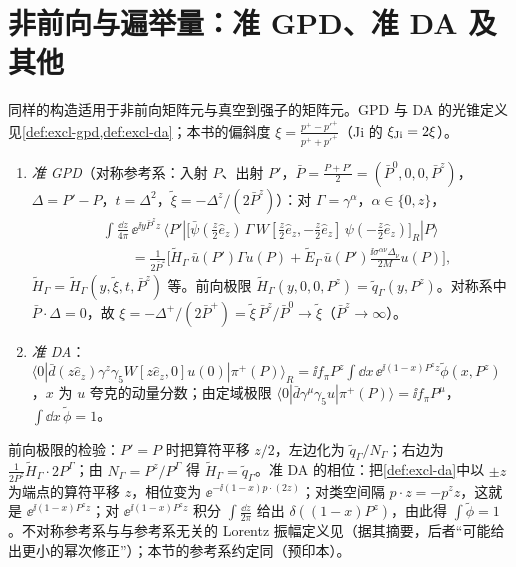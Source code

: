 \section{非前向与遍举量：准 GPD、准 DA 及其他}\label{sec:lamet-offforward}

同样的构造适用于非前向矩阵元与真空到强子的矩阵元。GPD 与 DA 的光锥定义见\cref{def:excl-gpd,def:excl-da}；本书的偏斜度 $\xi=\frac{p^+-p'^+}{p^++p'^+}$（Ji 的 $\xi_{\rm Ji}=2\xi$）。

\begin{definition}[准 GPD 与准 DA]\label{def:lamet-quasi-gpd}
\begin{enumerate}[label=(\roman*),leftmargin=2em,itemsep=1pt,topsep=2pt]
\item \emph{准 GPD}（对称参考系：入射 $P$、出射 $P'$，$\bar P=\frac{P+P'}2=(\bar P^0,0,0,\bar P^z)$，$\Delta=P'-P$，$t=\Delta^2$，$\tilde\xi=-\Delta^z/(2\bar P^z)$）：对 $\Gamma=\gamma^\alpha$，$\alpha\in\{0,z\}$，
\begin{equation}\label{eq:lamet-quasi-gpd}
\begin{split}
&\int\frac{\dd z}{4\pi}\,\ee^{\ii y\bar P^zz}\,\langle P'|\big[\bar\psi(\tfrac z2\hat e_z)\,\Gamma\, W[\tfrac z2\hat e_z,-\tfrac z2\hat e_z]\,\psi(-\tfrac z2\hat e_z)\big]_R|P\rangle\\
&\qquad=\frac1{2\bar P^z}\Big[\tilde H_\Gamma\,\bar u(P')\Gamma u(P)+\tilde E_\Gamma\,\bar u(P')\frac{\ii\sigma^{\alpha\nu}\Delta_\nu}{2M}u(P)\Big],
\end{split}
\end{equation}
$\tilde H_\Gamma=\tilde H_\Gamma(y,\tilde\xi,t,\bar P^z)$ 等。前向极限 $\tilde H_\Gamma(y,0,0,P^z)=\tilde q_\Gamma(y,P^z)$。对称系中 $\bar P\cdot\Delta=0$，故 $\xi=-\Delta^+/(2\bar P^+)=\tilde\xi\,\bar P^z/\bar P^0\to\tilde\xi$（$\bar P^z\to\infty$）。
\item \emph{准 DA}：$\langle0|\bar d(z\hat e_z)\gamma^z\gamma_5W[z\hat e_z,0]u(0)|\pi^+(P)\rangle_R=\ii f_\pi P^z\int\dd x\,\ee^{\ii(1-x)P^zz}\tilde\phi(x,P^z)$，$x$ 为 $u$ 夸克的动量分数；由定域极限 $\langle0|\bar d\gamma^\mu\gamma_5u|\pi^+(P)\rangle=\ii f_\pi P^\mu$，$\int\dd x\,\tilde\phi=1$。
\end{enumerate}
\end{definition}

前向极限的检验：$P'=P$ 时把算符平移 $z/2$，左边化为 $\tilde q_\Gamma/N_\Gamma$；右边为 $\frac1{2P^z}\tilde H_\Gamma\cdot2P^\Gamma$；由 $N_\Gamma=P^z/P^\Gamma$ 得 $\tilde H_\Gamma=\tilde q_\Gamma$。准 DA 的相位：把\cref{def:excl-da}中以 $\pm z$ 为端点的算符平移 $z$，相位变为 $\ee^{-\ii(1-x)p\cdot(2z)}$；对类空间隔 $p\cdot z=-p^zz$，这就是 $\ee^{\ii(1-x)P^zz}$；对 $\ee^{\ii(1-x)P^zz}$ 积分 $\int\frac{\dd z}{2\pi}$ 给出 $\delta((1-x)P^z)$，由此得 $\int\tilde\phi=1$。不对称参考系与与参考系无关的 Lorentz 振幅定义见\cite{Bhattacharya:2022aob}（据其摘要，后者“可能给出更小的幂次修正”）；本节的参考系约定同\cite{Su:2026eta}（预印本）。

